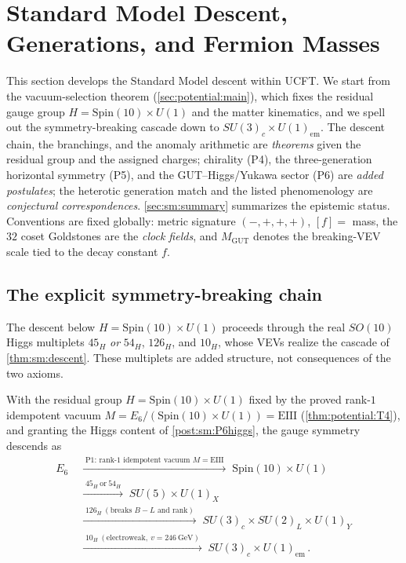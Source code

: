 \section{Standard Model Descent, Generations, and Fermion Masses}
\label{sec:sm:main}

This section develops the Standard Model descent within UCFT. We start
from the vacuum-selection theorem (\autoref{sec:potential:main}), which fixes
the residual gauge group $H = \mathrm{Spin}(10)\times U(1)$ and the matter
kinematics, and we spell out the symmetry-breaking cascade down to
$SU(3)_c\times U(1)_{\mathrm{em}}$. The descent chain, the branchings, and the
anomaly arithmetic are \emph{theorems} given the residual group and the assigned
charges; chirality (P4), the three-generation horizontal symmetry (P5), and the
GUT--Higgs/Yukawa sector (P6) are \emph{added postulates}; the heterotic
generation match and the listed phenomenology are \emph{conjectural
correspondences}. \autoref{sec:sm:summary} summarizes the epistemic status.
Conventions are fixed globally: metric signature $(-,+,+,+)$, $[f]=$ mass, the
$32$ coset Goldstones are the \emph{clock fields}, and $M_{\mathrm{GUT}}$ denotes
the breaking-VEV scale tied to the decay constant $f$.

\subsection{The explicit symmetry-breaking chain}
\label{sec:sm:descent}

\begin{postulate}\label{post:sm:P6higgs}
The descent below $H=\mathrm{Spin}(10)\times U(1)$ proceeds through the real
$SO(10)$ Higgs multiplets $45_H$ \emph{or} $54_H$, $126_H$, and $10_H$, whose VEVs
realize the cascade of \autoref{thm:sm:descent}. These multiplets are added
structure, not consequences of the two axioms.
\end{postulate}

\begin{theorem}\label{thm:sm:descent}
With the residual group $H=\mathrm{Spin}(10)\times U(1)$ fixed by the proved
rank-$1$ idempotent vacuum $M=E_6/(\mathrm{Spin}(10)\times U(1))=\mathrm{EIII}$
(\autoref{thm:potential:T4}), and granting the Higgs content of
\autoref{post:sm:P6higgs}, the gauge symmetry descends as
\begin{equation}\label{eq:sm:chain}
\begin{aligned}
E_6
 &\;\xrightarrow{\;\text{P1: rank-}1\text{ idempotent vacuum }M=\mathrm{EIII}\;}\;
 \mathrm{Spin}(10)\times U(1) \\
 &\;\xrightarrow{\;45_H\ \text{or}\ 54_H\;}\;
 SU(5)\times U(1)_X \\
 &\;\xrightarrow{\;126_H\ (\text{breaks }B\!-\!L\text{ and rank})\;}\;
 SU(3)_c\times SU(2)_L\times U(1)_Y \\
 &\;\xrightarrow{\;10_H\ (\text{electroweak},\ v=246\ \mathrm{GeV})\;}\;
 SU(3)_c\times U(1)_{\mathrm{em}}\,.
\end{aligned}
\end{equation}
\end{theorem}

